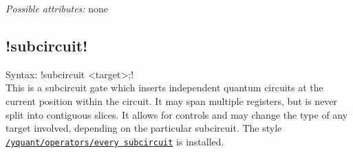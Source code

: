 \documentclass{scrartcl}
\def\style#1{\hyperref[style:#1]{\texttt{#1}}}
\begin{document}
         \emph{Possible attributes:} none

      \subsection[\texorpdfstring{\yquant!subcircuit!}{subcircuit}]{\yquant!subcircuit!}\label{gate:subcircuit}
         Syntax: \yquant!subcircuit <target>;! \\
         This is a subcircuit gate which inserts independent quantum circuits at the current position within the circuit.
         It may span multiple registers, but is never split into contiguous slices.
         It allows for controls and may change the type of any target involved, depending on the particular subcircuit.
         The style \style{/yquant/operators/every subcircuit} is installed.
\end{document}
